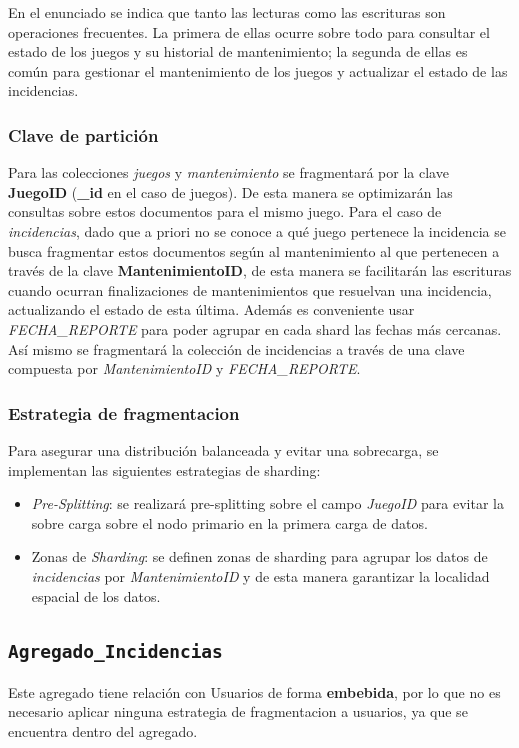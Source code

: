 \documentclass[]{article}
\begin{document}
En el enunciado se indica que tanto las lecturas como las escrituras son operaciones frecuentes. La primera de ellas ocurre sobre todo para consultar el estado de los juegos y su historial de mantenimiento; la segunda de ellas es común para gestionar el mantenimiento de los juegos y actualizar el estado de las incidencias.

\subsubsection{Clave de partición}
\label{subsubsec:particion_juegos}

Para las colecciones \textit{juegos} y \textit{mantenimiento} se fragmentará por la clave \textbf{JuegoID} (\textbf{\_id} en el caso de juegos). De esta manera se optimizarán las consultas sobre estos documentos para el mismo juego.
Para el caso de \textit{incidencias}, dado que a priori no se conoce a qué juego pertenece la incidencia se busca fragmentar estos documentos según al mantenimiento al que pertenecen a través de la clave \textbf{MantenimientoID}, de esta manera se facilitarán las escrituras cuando ocurran finalizaciones de mantenimientos que resuelvan una incidencia, actualizando el estado de esta última. Además es conveniente usar \textit{FECHA\_REPORTE} para poder agrupar en cada shard las fechas más cercanas. Así mismo se fragmentará la colección de incidencias a través de una clave compuesta por \textit{MantenimientoID} y \textit{FECHA\_REPORTE}.

\subsubsection{Estrategia de fragmentacion}
\label{subsubsec:fragmentacion_juegos}

Para asegurar una distribución balanceada y evitar una sobrecarga, se implementan las siguientes estrategias de sharding:
\begin{itemize}
    \item \textit{Pre-Splitting}: se realizará pre-splitting sobre el campo \textit{JuegoID} para evitar la sobre carga sobre el nodo primario en la primera carga de datos.
    \item Zonas de \textit{Sharding}: se definen zonas de sharding para agrupar los datos de \textit{incidencias} por \textit{MantenimientoID} y de esta manera garantizar la localidad espacial de los datos.
\end{itemize}

\subsection{\texttt{Agregado\_Incidencias}}
\label{subsec:incidencias}
Este agregado tiene relación con Usuarios de forma \textbf{embebida}, por lo que no es necesario aplicar ninguna estrategia de fragmentacion a usuarios, ya que se encuentra dentro del agregado.
\end{document}

